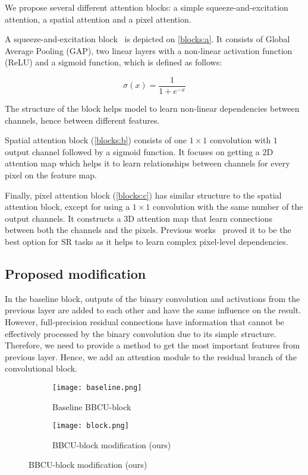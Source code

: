 \documentclass{article}
\begin{document}
We propose several different attention blocks: a simple squeeze-and-excitation attention, a spatial attention and a pixel attention.

A squeeze-and-excitation block~\cite{hu2018squeeze} is depicted on \ref{blocks:a}. It consists of Global Average Pooling (GAP), two linear layers with a non-linear activation function (ReLU) and a sigmoid function, which is defined as follows:

\begin{equation*}
    \sigma(x) = \dfrac{1}{1 + e^{-x}}
\end{equation*}

The structure of the block helps model to learn non-linear dependencies between channels, hence between different features.

Spatial attention block (\ref{blocks:b}) consists of one $1\times1$ convolution with $1$ output channel followed by a sigmoid function. It focuses on getting a 2D attention map which helps it to learn relationships between channels for every pixel on the feature map.

Finally, pixel attention block (\ref{blocks:c}) has similar structure to the spatial attention block, except for using a $1 \times 1$ convolution with the same number of the output channels. It constructs a 3D attention map that learn connections between both the channels and the pixels. Previous works~\cite{zhao2020efficient} proved it to be the best option for SR tasks as it helps to learn complex pixel-level dependencies.

\subsection{Proposed modification}
In the baseline block, outputs of the binary convolution and activations from the previous layer are added to each other and have the same influence on the result. However, full-precision residual connections have information that cannot be effectively processed by the binary convolution due to its simple structure. Therefore, we need to provide a method to get the most important features from previous layer. Hence, we add an attention module to the residual branch of the convolutional block. 

\begin{figure}[t]
\centering
\begin{subfigure}[b]{0.8\textwidth}
   \texttt{[image: baseline.png]}
   \caption{Baseline BBCU-block}
   \label{bbcu:a} 
\end{subfigure}

\begin{subfigure}[b]{0.8\textwidth}
   \texttt{[image: block.png]}
   \caption{BBCU-block modification (ours)}
   \label{bbcu:b}
\end{subfigure}
\end{figure}
\end{document}

